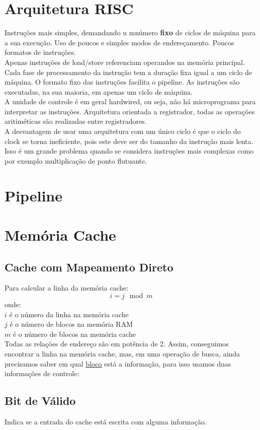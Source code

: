 \documentclass{article}
\begin{document}
	\section{Arquitetura RISC}
		Instruções mais simples, demandando u mnúmero \textbf{fixo} de ciclos de máquina para a sua execução. Uso de poucos e simples modos de endereçamento. Poucos formatos de instruções.\\
		Apenas instruções de load/store referenciam operandos na memória principal. Cada fase de processamento da instrução tem a duração fixa igual a um ciclo de máquina. O formato fixo das instruções facilita o pipeline. As instruções são executadas, na sua maioria, em apenas um ciclo de máquina.\\
		A unidade de controle é em geral hardwired, ou seja, não há microprograma para interpretar as instruções. Arquitetura orientada a registrador, todas as operações aritiméticas são realizadas entre registradores.\\
		A desvantagem de usar uma arquitetura com um único ciclo é que o ciclo do clock se torna ineficiente, pois este deve ser do tamanho da instrução mais lenta. Isso é um grande problema quando se considera instruções mais complexas como por exemplo multiplicação de ponto flutuante.
	
	\section{Pipeline}
	\section{Memória Cache}
		\subsection{Cache com Mapeamento Direto}
			Para calcular a linha da memória cache:
			$$i = j \mod m$$
			onde:\\
			$i$ é o número da linha na memória cache\\
			$j$ é o número de blocos na memória RAM\\
			$m$ é o número de blocos na memória cache\\
			Todas as relações de endereço são em potência de 2. Assim, conseguimos encontrar a linha na memória cache, mas, em uma operação de busca, ainda precisamos saber em qual \underline{bloco} está a informação, para isso usamos duas informações de controle:			
		\subsection{Bit de Válido}
			Indica se a entrada do cache está escrita com alguma informação.
\end{document}
